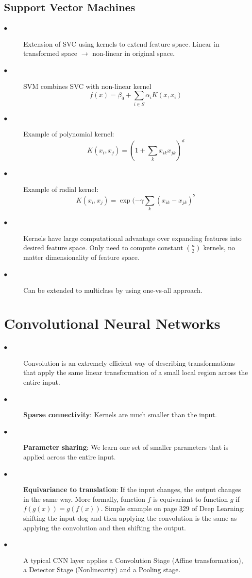 \documentclass{article}
\begin{document}
\subsection{Support Vector Machines}

\begin{description}
    \item[$\bullet$] Extension of SVC using kernels to extend feature space. Linear in transformed space $\longrightarrow$ non-linear in original space.
    
    \item[$\bullet$] SVM combines SVC with non-linear kernel
    \[f(x) = \beta_0 + \sum_{i \in S} \alpha_i K(x,x_i)\]
    
    \item[$\bullet$] Example of polynomial kernel:
    \[K(x_i,x_j) = (1+\sum_k x_{ik}x_{jk})^d\]
    
    \item[$\bullet$] Example of radial kernel:
    \[K(x_i,x_j) = \exp(-\gamma\sum_k (x_{ik}-x_{jk})^2\]
    
        \item[$\bullet$] Kernels have large computational advantage over expanding features into desired feature space. Only need to compute constant $\binom{n}{2}$ kernels, no matter dimensionality of feature space.
        
        \item[$\bullet$] Can be extended to multiclass by using one-vs-all approach.
\end{description}

\section{Convolutional Neural Networks}

\begin{description}
    \item[$\bullet$] Convolution is an extremely efficient way of describing transformations that apply the same linear transformation of a small local region across the entire input.
    
    
    \item[$\bullet$] \textbf{Sparse connectivity}: Kernels are much smaller than the input.
    
    \item[$\bullet$] \textbf{Parameter sharing}: We learn one set of smaller parameters that is applied across the entire input.
    
    \item[$\bullet$] \textbf{Equivariance to translation}: If the input changes, the output changes in the same way. More formally, function $f$ is equivariant to function $g$ if $f(g(x))=g(f(x))$. Simple example on page 329 of Deep Learning: shifting the input dog and then applying the convolution is the same as applying the convolution and then shifting the output.
    
    \item[$\bullet$] A typical CNN layer applies a Convolution Stage (Affine transformation), a Detector Stage (Nonlinearity) and a Pooling stage.
 \end{description}   
\end{document}
